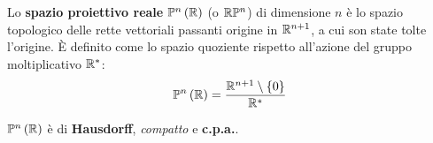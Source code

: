 \begin{define}
	Lo \textbf{spazio proiettivo reale} $\mathbb{P}^n\left(\mathbb{R}\right)$ (o $\mathbb{R}\mathbb{P}^n$) di dimensione $n$ è lo spazio topologico delle rette vettoriali passanti origine in $\mathbb{R}^{n+1}$, a cui son state tolte l'origine. È definito come lo spazio quoziente rispetto all'azione del gruppo moltiplicativo $\mathbb{R}^{\ast}$:
	\begin{equation}
		\mathbb{P}^n\left(\mathbb{R}\right)= \frac{\mathbb{R}^{n+1}\setminus \left\{0\right\}}{\mathbb{R}^{\ast}}
	\end{equation}
\end{define}
\begin{proposition}
$\mathbb{P}^n\left(\mathbb{R}\right)$ è di \textbf{Hausdorff}, \textit{compatto} e \textbf{c.p.a.}.
\end{proposition}

